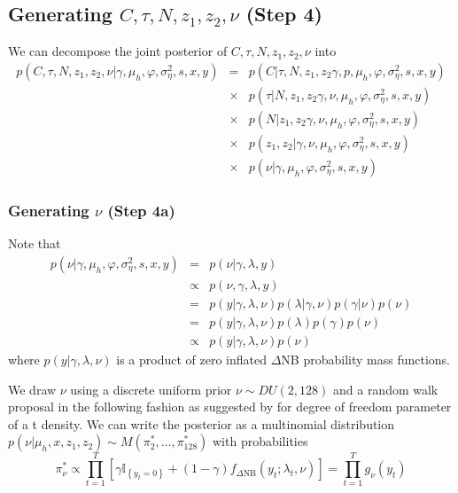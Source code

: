 \documentclass[12pt]{article}
\begin{document}
\subsection{Generating  $ C , \tau, N, z_1 , z_2 , \nu$ (Step 4)} 
 We can decompose the joint posterior of $C, \tau, N ,z_1 , z_2, \nu$ into
\begin{eqnarray}
p(C, \tau, N ,z_1 , z_2, \nu|\gamma,\mu_{h} ,\varphi,\sigma^{2}_{\eta},s,x ,y)&=& p(C |\tau, N, z_1 , z_2 \gamma, p, \mu_{h} ,\varphi,\sigma^{2}_{\eta},s,x ,y) \nonumber \\ 
&\times& p(\tau | N, z_1 , z_2 \gamma, \nu, \mu_{h} ,\varphi,\sigma^{2}_{\eta},s,x ,y)  \nonumber \\ 
&\times& p( N| z_1 , z_2 \gamma, \nu, \mu_{h} ,\varphi,\sigma^{2}_{\eta},s,x ,y)\nonumber \\ 
&\times& p(  z_1 , z_2 | \gamma, \nu, \mu_{h} ,\varphi,\sigma^{2}_{\eta},s,x ,y)\nonumber \\ 
&\times&   p(\nu | \gamma, \mu_{h} ,\varphi,\sigma^{2}_{\eta},s,x ,y)
\end{eqnarray} 

\subsubsection*{Generating $\nu$ (Step 4a) }
Note that
\begin{eqnarray}
p(\nu | \gamma, \mu_{h} ,\varphi,\sigma^{2}_{\eta},s,x ,y)&=& p(\nu | \gamma, \lambda,y) \nonumber \\
&\propto& p(\nu , \gamma, \lambda,y)\nonumber \\
&=& p(y|\gamma, \lambda,\nu )p( \lambda|\gamma,\nu )p( \gamma|\nu )p( \nu )
\nonumber \\
&=&  p(y|\gamma, \lambda,\nu )p( \lambda )p( \gamma )p( \nu )
 \nonumber \\
&\propto& p(y|\gamma, \lambda,\nu )p( \nu )
\end{eqnarray}
where $p(y|\gamma, \lambda,\nu )$ is a product of zero inflated $\Delta$NB probability mass functions. 

We draw $\nu$  using a discrete uniform prior $ \nu \sim DU(2,128)$ and a random walk proposal in the following fashion as suggested by \citet{JohannesStroud2014} for degree of freedom parameter of a t density. We can write the posterior as a multinomial distribution 
$p(\nu |  \mu_{h} ,x , z_1 , z_2) \sim M(\pi^{*}_2, \ldots, \pi^{*}_{128}) $ with probabilities
\begin{equation}
\pi^{*}_{\nu} \propto  \prod \limits_{t=1}^{T}
\left[\gamma\mathbb{I}_{\left\{ y_t =0\right\}}  + (1-\gamma)f_{\Delta\text{NB}}(y_t; \lambda_t, \nu ) \right]=  \prod \limits_{t=1}^{T} g_{\nu}(y_t) 
\end{equation}
 
\end{document}
